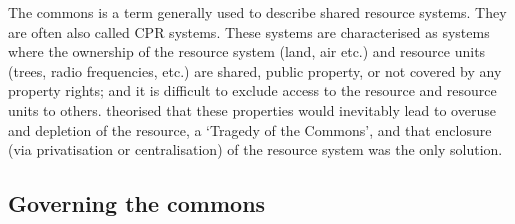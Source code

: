 The commons is a term generally used to describe shared resource systems. They are often also called \ac{CPR} systems. These systems are characterised as systems where the ownership of the resource system (land, air etc.) and resource units (trees, radio frequencies, etc.) are shared, public property, or not covered by any property rights; and it is difficult to exclude access to the resource and resource units to others. 
\citet{Hardin1968}\label{hardin} theorised that these properties would inevitably lead to overuse and depletion of the resource, a `Tragedy of the Commons', and that enclosure (via privatisation or centralisation) of the resource system was the only solution.

\subsection{Governing the commons}

